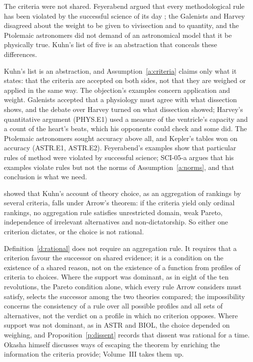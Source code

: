 \documentclass{situationist-preprint}
\begin{document}
\begin{objection}
The criteria were not shared. Feyerabend argued that every methodological rule has been violated by the successful science of its day \citep{Feyerabend1975}; the Galenists and Harvey disagreed about the weight to be given to vivisection and to quantity, and the Ptolemaic astronomers did not demand of an astronomical model that it be physically true. Kuhn's list of five is an abstraction that conceals these differences.
\end{objection}

\begin{reply}
Kuhn's list is an abstraction, and Assumption~\ref{a:criteria} claims only what it states: that the criteria are accepted on both sides, not that they are weighed or applied in the same way. The objection's examples concern application and weight. Galenists accepted that a physiology must agree with what dissection shows, and the debate over Harvey turned on what dissection showed; Harvey's quantitative argument (PHYS.E1) used a measure of the ventricle's capacity and a count of the heart's beats, which his opponents could check and some did. The Ptolemaic astronomers sought accuracy above all, and Kepler's tables won on accuracy (ASTR.E1, ASTR.E2). Feyerabend's examples show that particular rules of method were violated by successful science; SCI-05-a argues that his examples violate rules but not the norms of Assumption~\ref{a:norms}, and that conclusion is what we need.
\end{reply}

\begin{objection}
\citet{Okasha2011} showed that Kuhn's account of theory choice, as an aggregation of rankings by several criteria, falls under Arrow's theorem: if the criteria yield only ordinal rankings, no aggregation rule satisfies unrestricted domain, weak Pareto, independence of irrelevant alternatives and non-dictatorship. So either one criterion dictates, or the choice is not rational.
\end{objection}

\begin{reply}
Definition~\ref{d:rational} does not require an aggregation rule. It requires that a criterion favour the successor on shared evidence; it is a condition on the existence of a shared reason, not on the existence of a function from profiles of criteria to choices. Where the support was dominant, as in eight of the ten revolutions, the Pareto condition alone, which every rule Arrow considers must satisfy, selects the successor among the two theories compared; the impossibility concerns the consistency of a rule over all possible profiles and all sets of alternatives, not the verdict on a profile in which no criterion opposes. Where support was not dominant, as in ASTR and BIOL, the choice depended on weighing, and Proposition~\ref{p:dissent} records that dissent was rational for a time. Okasha himself discusses ways of escaping the theorem by enriching the information the criteria provide; Volume~III takes them up.
\end{reply}
\end{document}
